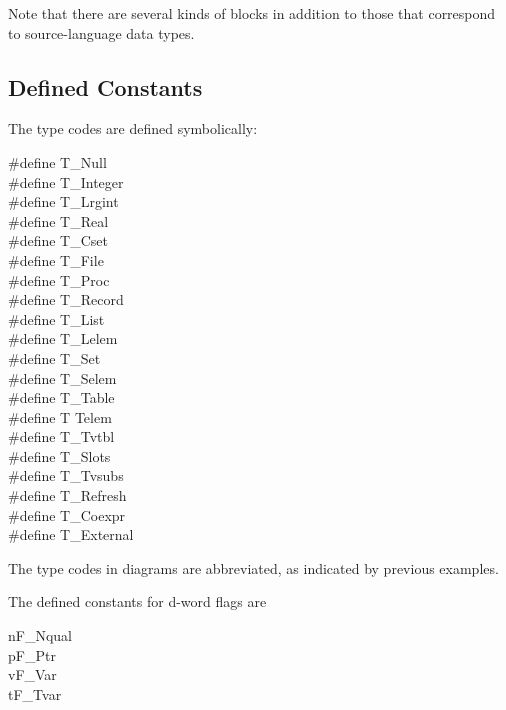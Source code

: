 Note that there are several kinds of blocks in addition to those that
correspond to source-language data types.

\subsection{Defined Constants}

The type codes are defined symbolically:

\begin{iconcode}
\#define\>\>\> T\_Null		\>\>\>\>\\	
\#define\>\>\> T\_Integer	\>\>\>\>\\	
\#define\>\>\> T\_Lrgint	\>\>\>\>\\	
\#define\>\>\> T\_Real		\>\>\>\>\\	
\#define\>\>\> T\_Cset		\>\>\>\>\\	
\#define\>\>\> T\_File		\>\>\>\>\\	
\#define\>\>\> T\_Proc		\>\>\>\>\\	
\#define\>\>\> T\_Record	\>\>\>\>\\	
\#define\>\>\> T\_List		\>\>\>\>\\	
\#define\>\>\> T\_Lelem		\>\>\>\>\\	
\#define\>\>\> T\_Set		\>\>\>\>\>10\\
\#define\>\>\> T\_Selem		\>\>\>\>\\
\#define\>\>\> T\_Table		\>\>\>\>\\
\#define\>\>\> T Telem		\>\>\>\>\>13\\
\#define\>\>\> T\_Tvtbl		\>\>\>\>\\
\#define\>\>\> T\_Slots		\>\>\>\>\\
\#define\>\>\> T\_Tvsubs	\>\>\>\>\\
\#define\>\>\> T\_Refresh	\>\>\>\>\\
\#define\>\>\> T\_Coexpr	\>\>\>\>\\
\#define\>\>\> T\_External	\>\>\>\>
\end{iconcode}

The type codes in diagrams are abbreviated, as indicated by previous examples.


The defined constants for d-word flags are

\begin{iconcode}
\>n\>\>F\_Nqual\\
\>p\>\>F\_Ptr\\
\>v\>\>F\_Var\\
\>t\>\>F\_Tvar
\end{iconcode}

